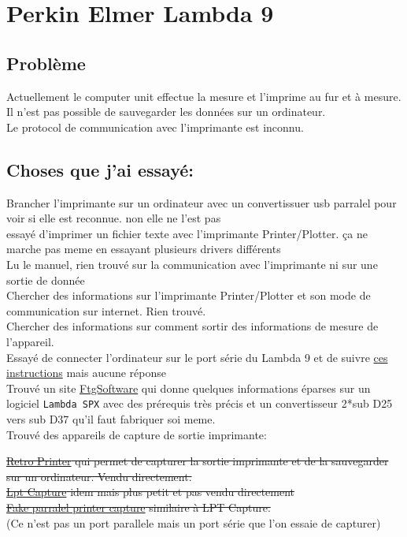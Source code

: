 \hypertarget{perkin-elmer-lambda-9}{%
\section{Perkin Elmer Lambda 9}\label{perkin-elmer-lambda-9}}

\hypertarget{probluxe8me}{%
\subsection{Problème}\label{probluxe8me}}

Actuellement le computer unit effectue la mesure et l'imprime au fur et
à mesure. Il n'est pas possible de sauvegarder les données sur un
ordinateur.\\
Le protocol de communication avec l'imprimante est inconnu.

\hypertarget{choses-que-jai-essayuxe9}{%
\subsection{Choses que j'ai essayé:}\label{choses-que-jai-essayuxe9}}

Brancher l'imprimante sur un ordinateur avec un convertissuer usb
parralel pour voir si elle est reconnue. non elle ne l'est pas\\
essayé d'imprimer un fichier texte avec l'imprimante Printer/Plotter. ça
ne marche pas meme en essayant plusieurs drivers différents\\
Lu le manuel, rien trouvé sur la communication avec l'imprimante ni sur
une sortie de donnée\\
Chercher des informations sur l'imprimante Printer/Plotter et son mode
de communication sur internet. Rien trouvé.\\
Chercher des informations sur comment sortir des informations de mesure
de l'appareil.\\
Essayé de connecter l'ordinateur sur le port série du Lambda 9 et de
suivre \href{https://ftgsoftware.com/issues_pe_ir_com.htm}{ces
instructions} mais aucune réponse\\
Trouvé un site
\href{https://ftgsoftware.com/issues_lambda19.htm}{FtgSoftware} qui
donne quelques informations éparses sur un logiciel \texttt{Lambda\ SPX}
avec des prérequis très précis et un convertisseur 2*sub D25 vers sub
D37 qu'il faut fabriquer soi meme.\\
Trouvé des appareils de capture de sortie imprimante:

\sout{\href{https://www.retroprinter.com/}{Retro Printer} qui permet de
capturer la sortie imprimante et de la sauvegarder sur un ordinateur.
Vendu directement.}\\
\sout{\href{https://github.com/bkw777/LPT_Capture}{Lpt Capture} idem
mais plus petit et pas vendu directement}\\
\sout{\href{https://tomverbeure.github.io/2023/01/24/Fake-Parallel-Printer-Capture-Tool-HW.html}{Fake
parralel printer capture} similaire à LPT Capture.}\\
(Ce n'est pas un port parallele mais un port série que l'on essaie de
capturer)

